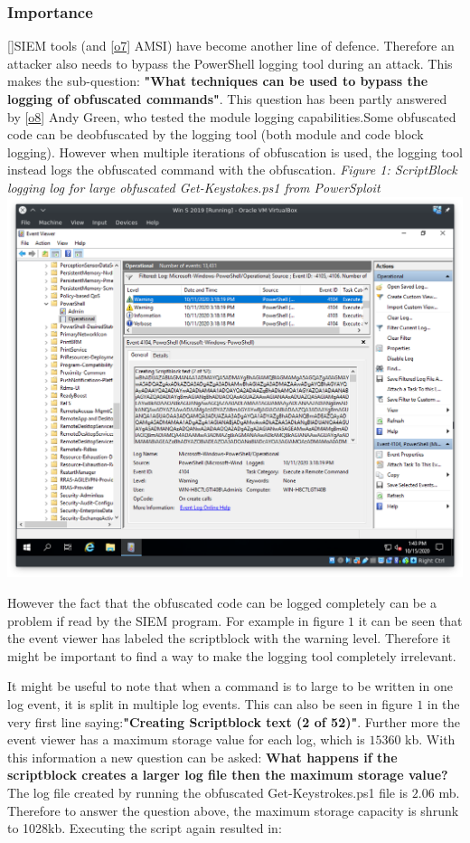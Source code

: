 \documentclass{article}%
\begin{document}
\subsubsection{Importance}
[\hyperlink{13}]SIEM tools (and [\hyperlink{o7}{o7}] AMSI) have become another line of defence. Therefore an attacker also needs to bypass the PowerShell logging tool during an attack. This makes the sub-question: \textbf{"What techniques can be used to bypass the logging of obfuscated commands"}. This question has been partly answered by [\hyperlink{o8}{o8}] Andy Green, who tested the module logging capabilities.Some obfuscated code can be deobfuscated by the logging tool (both module and code block logging). However when multiple iterations of obfuscation is used, the logging tool instead logs the obfuscated command with the obfuscation.
\newline\newline
\hypertarget{fig1}{
	\textit{Figure 1: ScriptBlock logging log for large obfuscated Get-Keystokes.ps1 from PowerSploit}\\
	\includegraphics[scale=0.44]{1.png}
}

However the fact that the obfuscated code can be logged completely can be a problem if read by the SIEM program. For example in figure $1$ it can be seen that the event viewer has labeled the scriptblock with the warning level. Therefore it might be important to find a way to make the logging tool completely irrelevant.

It might be useful to note that when a command is to large to be written in one log event, it is split in multiple log events. This can also be seen in figure $1$ in the very first line saying:\textbf{"Creating Scriptblock text (2 of 52)"}. Further more the event viewer has a maximum storage value for each log, which is $15360$ kb. With this information a new question can be asked: \textbf{What happens if the scriptblock creates a larger log file then the maximum storage value?} The log file created by running the obfuscated Get-Keystrokes.ps1 file is $2.06$ mb. Therefore to answer the question above, the maximum storage capacity is shrunk to 1028kb. Executing the script again resulted in:\newline\newline
\end{document}
